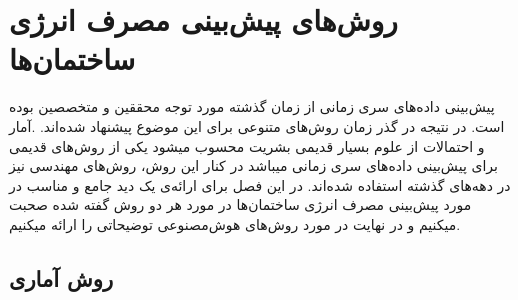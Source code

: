\chapter{روش‌های پیش‌بینی مصرف انرژی ساختمان‌ها}
پیش‌بینی داده‌های سری زمانی از زمان گذشته مورد توجه محققین و متخصصین بوده است. در نتیجه در گذر زمان روش‌های متنوعی برای این موضوع پیشنهاد شده‌اند.
.آمار و احتمالات از علوم بسیار قدیمی بشریت محسوب میشود یکی از روش‌های قدیمی برای پیش‌بینی داده‌های سری زمانی میباشد در کنار این روش، روش‌های مهندسی نیز در دهه‌های گذشته استفاده شده‌اند.
در این فصل برای ارائه‌ی یک دید جامع و مناسب در مورد پیش‌بینی مصرف انرژی ساختمان‌ها در مورد هر دو روش گفته شده صحبت میکنیم و در نهایت در مورد روش‌های هوش‌مصنوعی توضیحاتی را ارائه میکنیم.


\section{روش آماری}

